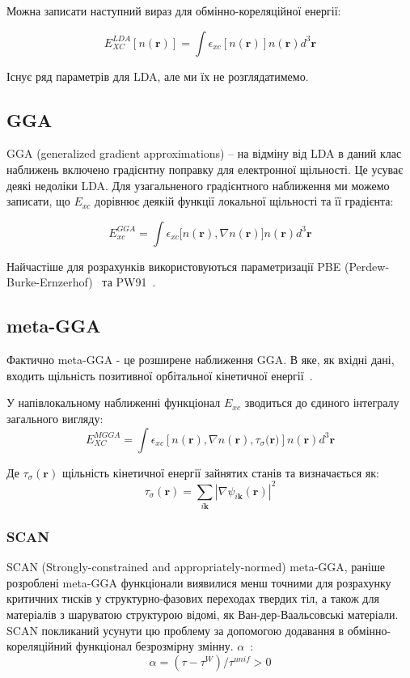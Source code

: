 Можна записати наступний вираз для обмінно-кореляційної енергії:

\begin{equation}
    E_{XC}^{LDA}[n(\textbf{r})] = \int{\epsilon_{xc}[n(\textbf{r})]n(\textbf{r})d^3\textbf{r}}
\end{equation}

Існує ряд параметрів для LDA, але ми їх не розглядатимемо.

\subsection{GGA}
GGA (generalized gradient approximations) -- на відміну від LDA в даний клас наближень включено градієнтну поправку для електронної щільності. Це усуває деякі недоліки LDA. Для узагальненого градієнтного наближення ми можемо записати, що $E_{xc}$ дорівнює деякій функції локальної щільності та її градієнта:

\begin{equation}
    E_{xc}^{GGA} = \int{\epsilon_{xc}[n(\textbf{r}),\nabla{n(\textbf{r})]n(\textbf{r})d^3\textbf{r}}}
\end{equation}

Найчастіше для розрахунків використовуються параметризації PBE (Perdew-Burke-Ernzerhof)~\cite{PBE} та PW91~\cite{PW91}.

\subsection{meta-GGA}
Фактично meta-GGA - це розширене наближення GGA. В яке, як вхідні дані, входить щільність позитивної орбітальної кінетичної енергії~\cite{Swapan&Gosh&Parr, Becke&Roussel, Tao&Perdew}.

У напівлокальному наближенні функціонал $E_{xc}$ зводиться до єдиного інтегралу загального вигляду:
\begin{equation}
    E_{XC}^{MGGA} = \int{\epsilon_{xc}[n(\textbf{r}),\nabla{n(\textbf{r}),\tau_{\sigma}(\textbf{r}})]}n(\textbf{r})d^3\textbf{r}
\end{equation}

Де $\tau_{\sigma}(\textbf{r})$ щільність кінетичної енергії зайнятих станів та визначається як:
\begin{equation}
    \tau_{\sigma}(\textbf{r}) = \sum\limits_{i\textbf{k}}|\nabla\psi_{i\textbf{k}}(\textbf{r})|^2
\end{equation}
\subsubsection{SCAN}
SCAN (Strongly-constrained and appropriately-normed) meta-GGA, раніше розроблені meta-GGA функціонали виявилися менш точними для розрахунку критичних тисків у структурно-фазових переходах твердих тіл, а також для матеріалів з шаруватою структурою відомі, як Ван-дер-Ваальсовські матеріали. SCAN покликаний усунути цю проблему за допомогою додавання в обмінно-кореляційний функціонал безрозмірну змінну.
$\alpha$~\cite{SCAN}:
\begin{equation}
    \alpha = (\tau - \tau^W)/\tau^{unif} > 0
    \label{eqn:alpha}
\end{equation}

